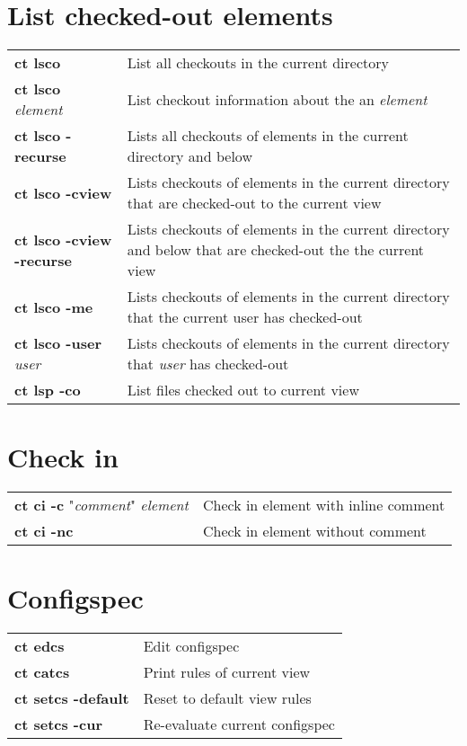 \documentclass[10pt,twocolumn]{article}
\begin{document}
\section*{List checked-out elements}
\begin{tabularx}{10.2cm}{l|X}
  \textbf{ct lsco}                  & List all checkouts in the current directory \\
  \textbf{ct lsco} \textit{element} & List checkout information about the an \textit{element} \\
  \textbf{ct lsco -recurse}         & Lists all checkouts of elements in the current directory and below \\
  \textbf{ct lsco -cview}           & Lists checkouts of elements in the current directory that are checked-out to the current view \\
  \textbf{ct lsco -cview -recurse}  & Lists checkouts of elements in the current directory and below that are checked-out the the current view \\ 
  \textbf{ct lsco -me}              & Lists checkouts of elements in the current directory that the current user has checked-out \\
  \textbf{ct lsco -user} \textit{user} & Lists checkouts of elements in the current directory that \textit{user} has checked-out \\  
  \textbf{ct lsp -co}                     & List files checked out to current view \\
\end{tabularx}

\section*{Check in}
\begin{tabularx}{10.2cm}{l|X}
  \textbf{ct ci -c} "\textit{comment}" \textit{element} & Check in element with inline comment \\
  \textbf{ct ci -nc}                                 & Check in element without comment \\
\end{tabularx}

\section*{Configspec}
\begin{tabularx}{10.2cm}{l|X}
  \textbf{ct edcs}            & Edit configspec \\
  \textbf{ct catcs}           & Print rules of current view \\
  \textbf{ct setcs -default}  & Reset to default view rules \\
  \textbf{ct setcs -cur}      & Re-evaluate current configspec \\
\end{tabularx}
\end{document}
